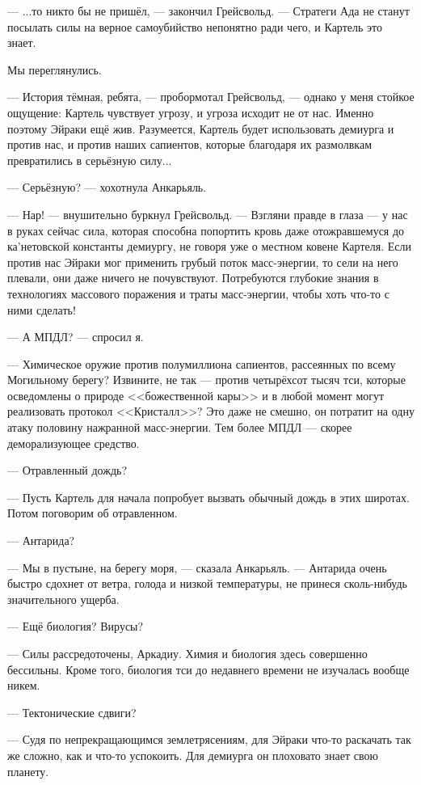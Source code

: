--- ...то никто бы не пришёл, --- закончил Грейсвольд.
--- Стратеги Ада не станут посылать силы на верное самоубийство непонятно ради чего, и Картель это знает.

Мы переглянулись.

--- История тёмная, ребята, --- пробормотал Грейсвольд, --- однако у меня стойкое ощущение: Картель чувствует угрозу, и угроза исходит не от нас.
Именно поэтому Эйраки ещё жив.
Разумеется, Картель будет использовать демиурга и против нас, и против наших сапиентов, которые благодаря их размолвкам превратились в серьёзную силу...

--- Серьёзную? --- хохотнула Анкарьяль.

--- Нар! --- внушительно буркнул Грейсвольд.
--- Взгляни правде в глаза --- у нас в руках сейчас сила, которая способна попортить кровь даже отожравшемуся до ка'нетовской константы демиургу, не говоря уже о местном ковене Картеля.
Если против нас Эйраки мог применить грубый поток масс-энергии, то сели на него плевали, они даже ничего не почувствуют.
Потребуются глубокие знания в технологиях массового поражения и траты масс-энергии, чтобы хоть что-то с ними сделать!

--- А МПДЛ? --- спросил я.

--- Химическое оружие против полумиллиона сапиентов, рассеянных по всему Могильному берегу?
Извините, не так --- против четырёхсот тысяч тси, которые осведомлены о природе <<божественной кары>> и в любой момент могут реализовать протокол <<Кристалл>>?
Это даже не смешно, он потратит на одну атаку половину нажранной масс-энергии.
Тем более МПДЛ --- скорее деморализующее средство.

--- Отравленный дождь?

--- Пусть Картель для начала попробует вызвать обычный дождь в этих широтах.
Потом поговорим об отравленном.

--- Антарида?

--- Мы в пустыне, на берегу моря, --- сказала Анкарьяль.
--- Антарида очень быстро сдохнет от ветра, голода и низкой температуры, не принеся сколь-нибудь значительного ущерба.

--- Ещё биология?
Вирусы?

--- Силы рассредоточены, Аркадиу.
Химия и биология здесь совершенно бессильны.
Кроме того, биология тси до недавнего времени не изучалась вообще никем.

--- Тектонические сдвиги?

--- Судя по непрекращающимся землетрясениям, для Эйраки что-то раскачать так же сложно, как и что-то успокоить.
Для демиурга он плоховато знает свою планету.

